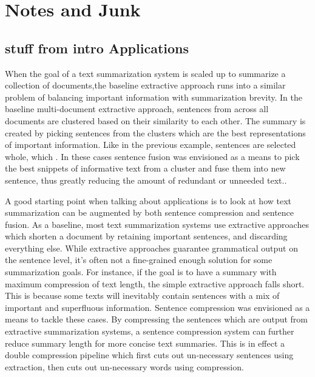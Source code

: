\section{Notes and Junk}



\subsection{stuff from intro Applications}



{When the goal of a text summarization system is scaled up to summarize a collection of documents,the baseline extractive approach runs into a similar problem of balancing important information with summarization brevity. In the baseline multi-document extractive approach, sentences from across all documents are clustered based on their similarity to each other.  The summary is created by picking sentences from the clusters which are the best representations of important information.  Like in the previous example, sentences are selected whole, which . In these cases sentence fusion was envisioned as a means to pick the best snippets of informative text from a cluster and fuse them into new sentence, thus greatly reducing the amount of redundant or unneeded text.\citet{bla}.}




{A good starting point when talking about applications is to look at how text summarization can be augmented by both sentence compression and sentence fusion.  As a baseline, most text summarization systems use extractive approaches which shorten a document by retaining important sentences, and discarding everything else.  While extractive approaches guarantee grammatical output on the sentence level, it's often not a fine-grained enough solution for some summarization goals.  For instance, if the goal is to have a summary with maximum compression of text length, the simple extractive approach falls short.  This is because some texts will inevitably contain sentences with a mix of important and superfluous information.  Sentence compression was envisioned as a means to tackle these cases.  By compressing the sentences which are output from extractive summarization systems, a sentence compression system can further reduce summary length for more concise text summaries.  This is in effect a double compression pipeline which first cuts out un-necessary sentences using extraction, then cuts out un-necessary words using compression.}
